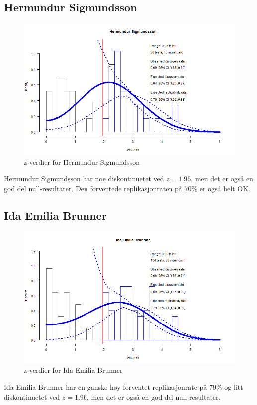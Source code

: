 \documentclass[doc,norsk]{apa7}
\begin{document}
\subsection{Hermundur Sigmundsson}
\begin{figure}[h!]
    \centering
    \includegraphics[width=\textwidth]{images/Hermundur Sigmundsson.png}
    \caption{z-verdier for Hermundur Sigmundsson}
\end{figure}
Hermundur Sigmundsson har noe diskontinuetet ved $z=1.96$, men det er også en god del null-resultater. Den forventede replikasjonraten på 70\% er også helt OK.

\subsection{Ida Emilia Brunner}
\begin{figure}[h!]
    \centering
    \includegraphics[width=\textwidth]{images/Ida Emilia Brunner.png}
    \caption{z-verdier for Ida Emilia Brunner}
\end{figure}
Ida Emilia Brunner har en ganske høy forventet replikasjonrate på 79\% og litt diskontinuetet ved $z=1.96$, men det er også en god del null-resultater.
\end{document}
